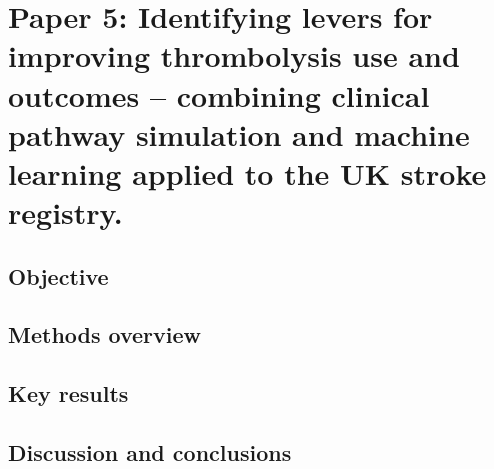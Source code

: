 \section{Paper 5: Identifying levers for improving thrombolysis use and outcomes – combining clinical pathway simulation and machine learning applied to the UK stroke registry.\cite{pearn_identifying_2024}} \label{sec:paper_1}

\subsection{Objective}

\subsection{Methods overview}

\subsection{Key results}

\subsection{Discussion and conclusions}